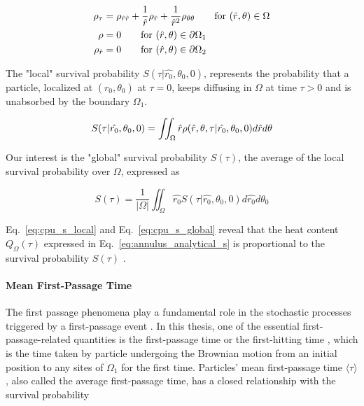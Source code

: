 \begin{align}
  \rho_{\tau} & = \rho_{\hat r\hat r} + \frac{1}{\hat r} \rho_{\hat r} + \frac{1}{\hat{r}^2} \rho_{\theta\theta}
  \qquad\text{for $(\hat r, \theta) \in \Omega$}\label{eq:polar_coordinate_diffusion_conditional_prob} \\
  \rho & = 0
  \qquad\text{for $(\hat r, \theta) \in \partial \Omega_1$}\label{eq:Dirichlet_bc_conditional_prob} \\
  \rho_{\hat r} & = 0
  \qquad\text{for $(\hat r, \theta) \in \partial \Omega_2$}\label{eq:Neumann_bc_conditional_prob} \\
\end{align}


The "local" survival probability $S(\tau | \hat{r_0}, \theta_0, 0)$,
represents the probability that a particle, localized at
$(\hat{r_0}, \theta_0)$ at $\tau=0$, keeps diffusing in $\Omega$ at
time $\tau > 0$ and is unabsorbed by the boundary $\Omega_1$. 

\begin{equation}\label{eq:cpu_s_local}
  S(\tau | \hat{r_0}, \theta_0, 0) = \iint_{\Omega} \hat r \rho(\hat r, \theta, \tau | \hat{r_0}, \theta_0, 0) d \hat r d\theta 
\end{equation}

Our interest is the "global" survival probability $S(\tau)$, the average of the local
survival probability over $\Omega$, expressed as

\begin{equation}\label{eq:cpu_s_global}
  S(\tau) = \frac{1}{|\Omega|}\iint_{\Omega} \hat{r_0} S(\tau | \hat{r_0}, \theta_0, 0) d \hat{r_0} d \theta_0
\end{equation}

Eq.~\ref{eq:cpu_s_local} and Eq.~\ref{eq:cpu_s_global} reveal that the
heat content $Q_{\Omega}(\tau)$ expressed in
Eq.~\ref{eq:annulus_analytical_s} is proportional to the survival
probability $S(\tau)$ \cite{kalinay2011survival}. 


\paragraph{Mean First-Passage Time}

The first passage phenomena play a fundamental role in the stochastic
processes triggered by a first-passage
event \cite{van1992stochastic}. In this thesis, one of the essential
first-passage-related quantities is the first-passage time or the
first-hitting time \cite{redner2001guide}, which is the time taken by
particle undergoing the Brownian motion from an initial position to
any sites of $\Omega_1$ for the first time. Particles' mean
first-passage time $\langle \tau \rangle$, also called the average
first-passage time, has a closed relationship with the survival
probability \cite{redner2001guide}

